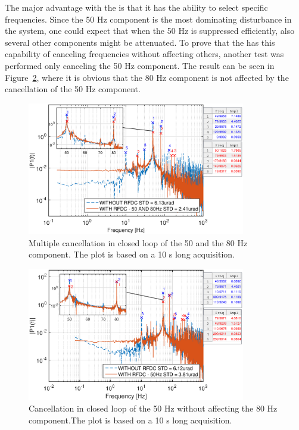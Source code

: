 The major advantage with the \abbrRFDC is that it has the ability to select specific frequencies. Since the 50 Hz component is the most dominating disturbance in the system, one could expect that when the 50 Hz is suppressed efficiently, also several other components might be attenuated. To prove that the \abbrRFDC has this capability of canceling frequencies without affecting others, another test was performed only canceling the 50 Hz component. The result can be seen in Figure~\ref{fig:mult50no80}, where it is obvious that the 80 Hz component is not affected by the cancellation of the 50 Hz component.

\begin{figure}[h]
  \centering %
  \includegraphics[width=0.85\textwidth]{fig/matlab/mult_50_80_closed_loop}
  \caption{\label{fig:mult5080} Multiple cancellation in closed loop of the 50 and the 80 Hz component. The plot is based on a 10 s long acquisition.}
\end{figure}

\begin{figure}[h]
  \centering %
  \includegraphics[width=0.85\textwidth]{fig/matlab/mult_50_selected_closed_loop}
  \caption{\label{fig:mult50no80} Cancellation in closed loop of the 50 Hz without affecting the 80 Hz component.The plot is based on a 10 s long acquisition.}
\end{figure}

